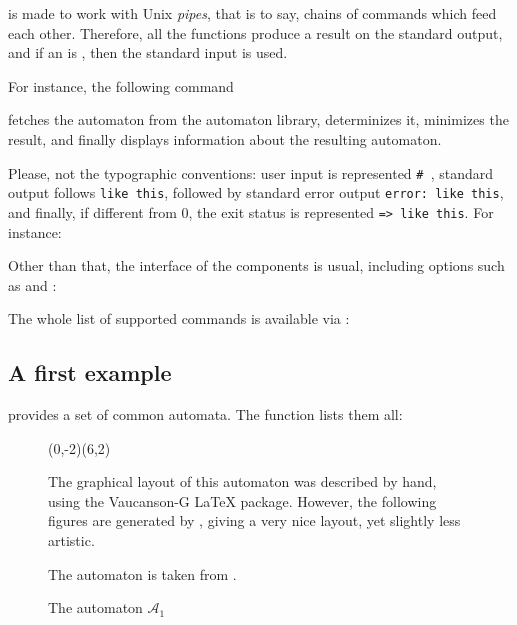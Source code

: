 \tafkit is made to work with Unix \emph{pipes}, that is to say, chains
of commands which feed each other.  Therefore, all the functions
produce a result on the standard output, and if an  is
\samp{-}, then the standard input is used.

\smallskip

For instance, the following command


\noindent
fetches the automaton  from the automaton library,
determinizes it, minimizes the result, and finally displays
information about the resulting automaton.

Please, not the typographic conventions: user input is represented
\texttt{\# }, standard output follows \texttt{like
  this}, followed by standard error output \texttt{error: like this},
and finally, if different from 0, the exit status is represented
\texttt{=> like this}.  For instance:


\smallskip

Other than that, the interface of the \tafkit components is usual,
including options such as  and :


The whole list of supported commands is available via
:


\subsection{A first example}

\Vauc provides a set of common automata.  The function
 lists them all:


\begin{figure}[ht] \centering
  \begin{VCPicture}{(0,-2)(6,2)}
  \end{VCPicture}
  \begin{legend}
    The graphical layout of this automaton was described by hand,
    using the Vaucanson-G \LaTeX{} package.  However, the following
    figures are generated by \tafkit, giving a very nice layout, yet
    slightly less artistic.

    The automaton is taken from \citet[Fig. I.1.1, p.
    58]{sakarovitch.03.eta}.
  \end{legend}
  \caption{The automaton $\mathcal{A}_1$}
  \label{fig:a1}
\end{figure}

